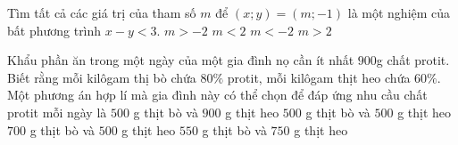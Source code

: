 \begin{ex}%
    Tìm tất cả các giá trị của tham số $m$ để $(x;y)=(m;-1)$ là một nghiệm của bất phương trình $x-y<3$.
    \choice
    {$m>-2$}
    {\True $m<2$}
    {$m<-2$}
    {$m>2$}
\end{ex}
\begin{ex} %
    Khẩu phần ăn trong một ngày của một gia đình nọ cần ít nhất $900$g chất protit. Biết rằng mỗi kilôgam thị bò chứa $80\%$ protit, mỗi kilôgam thịt heo chứa $60\%$. Một phương án hợp lí mà gia đình này có thể chọn để đáp ứng nhu cầu chất protit mỗi ngày là
    \choice
    {\True $500$ g thịt bò và $900$ g thịt heo}
    {$500$ g thịt bò và $500$ g thịt heo}
    {$700$ g thịt bò và $500$ g thịt heo}
    {$550$ g thịt bò và $750$ g thịt heo}
\end{ex}
